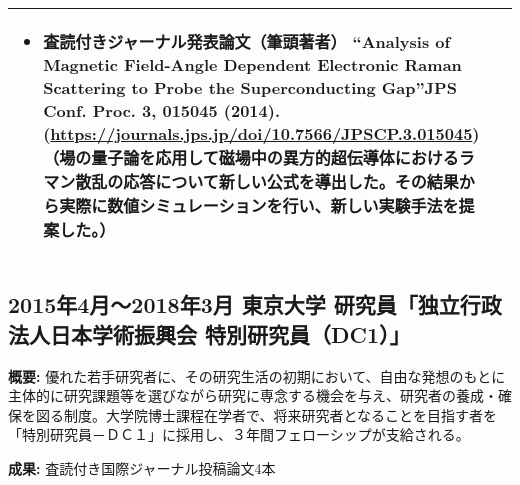 \documentclass[uplatex,a4j,10.5pt,dvipdfmx]{jsarticle}
\begin{document}
\begin{longtable}{|l|p{14cm}|}
\begin{itemize}
		                                    \item 査読付きジャーナル発表論文（筆頭著者） “Analysis of Magnetic Field-Angle Dependent Electronic Raman Scattering to Probe the Superconducting Gap”JPS Conf. Proc. 3, 015045 (2014). (\url{https://journals.jps.jp/doi/10.7566/JPSCP.3.015045})（場の量子論を応用して磁場中の異方的超伝導体におけるラマン散乱の応答について新しい公式を導出した。その結果から実際に数値シミュレーションを行い、新しい実験手法を提案した。）
	                                    \end{itemize} \\
	\hline
\end{longtable}

\subsection{2015年4月～2018年3月 東京大学 研究員「独立行政法人日本学術振興会 特別研究員（DC1）」}

\noindent\textbf{概要:} 優れた若手研究者に、その研究生活の初期において、自由な発想のもとに主体的に研究課題等を選びながら研究に専念する機会を与え、研究者の養成・確保を図る制度。大学院博士課程在学者で、将来研究者となることを目指す者を「特別研究員－ＤＣ１」に採用し、３年間フェローシップが支給される。

\noindent\textbf{成果:} 査読付き国際ジャーナル投稿論文4本
\end{document}
